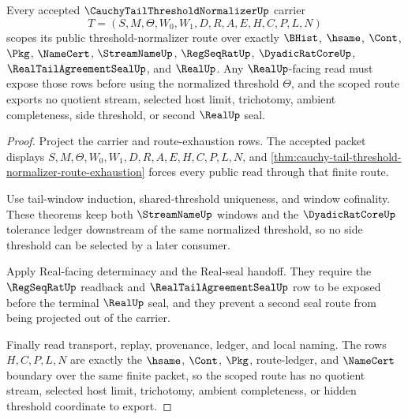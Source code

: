 \begin{theorem}
\label{thm:cauchy-tail-threshold-normalizer-scoped-kernel-route}
Every accepted $\CauchyTailThresholdNormalizerUp$ carrier
$$
T=(S,M,\Theta,W_0,W_1,D,R,A,E,H,C,P,L,N)
$$
scopes its public threshold-normalizer route over exactly $\BHist$, $\hsame$, $\Cont$, $\Pkg$, $\NameCert$, $\StreamNameUp$, $\RegSeqRatUp$, $\DyadicRatCoreUp$, $\RealTailAgreementSealUp$, and $\RealUp$. Any $\RealUp$-facing read must expose those rows before using the normalized threshold $\Theta$, and the scoped route exports no quotient stream, selected host limit, trichotomy, ambient completeness, side threshold, or second $\RealUp$ seal.
\end{theorem}
\begin{proof}
Project the carrier and route-exhaustion rows. The accepted packet displays $S,M,\Theta,W_0,W_1,D,R,A,E,H,C,P,L,N$, and \autoref{thm:cauchy-tail-threshold-normalizer-route-exhaustion} forces every public read through that finite route.

Use tail-window induction, shared-threshold uniqueness, and window cofinality. These theorems keep both $\StreamNameUp$ windows and the $\DyadicRatCoreUp$ tolerance ledger downstream of the same normalized threshold, so no side threshold can be selected by a later consumer.

Apply Real-facing determinacy and the Real-seal handoff. They require the $\RegSeqRatUp$ readback and $\RealTailAgreementSealUp$ row to be exposed before the terminal $\RealUp$ seal, and they prevent a second seal route from being projected out of the carrier.

Finally read transport, replay, provenance, ledger, and local naming. The rows $H,C,P,L,N$ are exactly the $\hsame$, $\Cont$, $\Pkg$, route-ledger, and $\NameCert$ boundary over the same finite packet, so the scoped route has no quotient stream, selected host limit, trichotomy, ambient completeness, or hidden threshold coordinate to export.
\end{proof}


